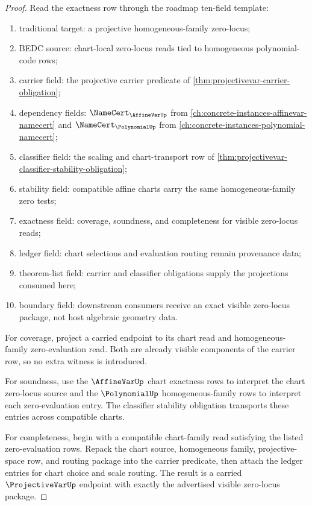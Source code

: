 \begin{proof}
Read the exactness row through the roadmap ten-field template:
\begin{enumerate}
  \item traditional target: a projective homogeneous-family zero-locus;
  \item BEDC source: chart-local zero-locus reads tied to homogeneous polynomial-code rows;
  \item carrier field: the projective carrier predicate of \autoref{thm:projectivevar-carrier-obligation};
  \item dependency fields: $\NameCert_{\AffineVarUp}$ from \autoref{ch:concrete-instances-affinevar-namecert} and $\NameCert_{\PolynomialUp}$ from \autoref{ch:concrete-instances-polynomial-namecert};
  \item classifier field: the scaling and chart-transport row of \autoref{thm:projectivevar-classifier-stability-obligation};
  \item stability field: compatible affine charts carry the same homogeneous-family zero tests;
  \item exactness field: coverage, soundness, and completeness for visible zero-locus reads;
  \item ledger field: chart selections and evaluation routing remain provenance data;
  \item theorem-list field: carrier and classifier obligations supply the projections consumed here;
  \item boundary field: downstream consumers receive an exact visible zero-locus package, not host algebraic geometry data.
\end{enumerate}

For coverage, project a carried endpoint to its chart read and homogeneous-family zero-evaluation read. Both are already visible components of the carrier row, so no extra witness is introduced.

For soundness, use the $\AffineVarUp$ chart exactness rows to interpret the chart zero-locus source and the $\PolynomialUp$ homogeneous-family rows to interpret each zero-evaluation entry. The classifier stability obligation transports these entries across compatible charts.

For completeness, begin with a compatible chart-family read satisfying the listed zero-evaluation rows. Repack the chart source, homogeneous family, projective-space row, and routing package into the carrier predicate, then attach the ledger entries for chart choice and scale routing. The result is a carried $\ProjectiveVarUp$ endpoint with exactly the advertised visible zero-locus package.
\end{proof}


